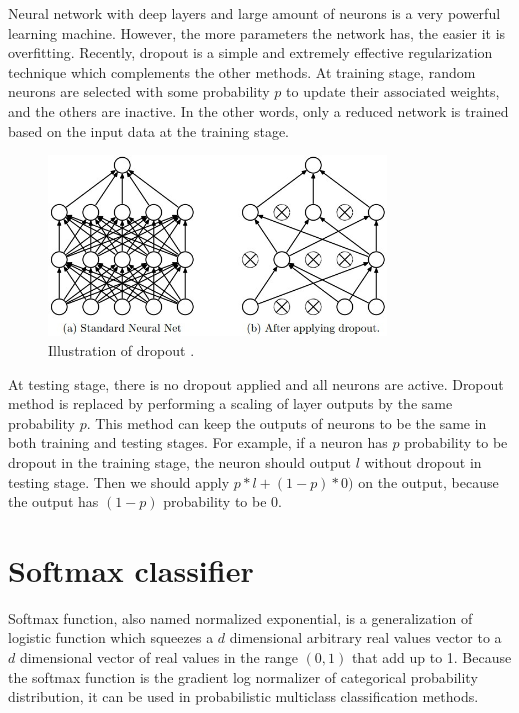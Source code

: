 Neural network with deep layers and large amount of neurons is a very powerful learning machine. However, the more parameters the network has, the easier it is overfitting. Recently, dropout\citep{srivastava2014dropout} is a simple and extremely effective regularization technique which complements the other methods. At training stage, random neurons are selected with some probability $p$ to update their associated weights, and the others are inactive. In the other words, only a reduced network is trained based on the input data at the training stage. 
\graphicspath{ {./Figures/} }
\begin{figure}[!htb]
\centering
\includegraphics[width=0.8\textwidth]{dropout.jpeg}
\caption{\label{fig:Dropout}Illustration of dropout \citep{srivastava2014dropout}.}
\end{figure}
At testing stage, there is no dropout applied and all neurons are active. Dropout method is replaced by performing a scaling of layer outputs by the same probability $p$. This method can keep the outputs of neurons to be the same in both training and testing stages. For example, if a neuron has $p$ probability to be dropout in the training stage, the neuron should output $l$ without dropout in testing stage. Then we should apply $p\ast l + (1 - p)\ast 0)$ on the output, because the output has $(1-p)$ probability to be $0$.

\section{Softmax classifier}

Softmax function, also named normalized exponential, is a generalization of logistic function which squeezes a $d$ dimensional arbitrary real values vector to a $d$ dimensional vector of real values in the range $(0,1)$ that add up to 1. Because the softmax function is the gradient log normalizer of categorical probability distribution, it can be used in probabilistic multiclass classification methods.

